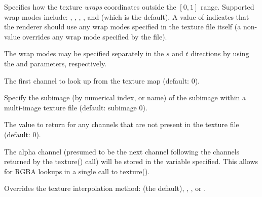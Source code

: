 \documentclass[11pt,letterpaper]{book}
\begin{document}
\vspace{12pt}

Specifies how the texture \emph{wraps} coordinates outside the $[0,1]$
range.  Supported wrap modes include: , ,
, , and  (which is the default).  A
value of  indicates that the renderer should use any wrap
modes specified in the texture file itself (a non- value
overrides any wrap mode specified by the file).

The wrap modes may be specified separately in the $s$ and $t$ directions
by using the  and  parameters, respectively.
\apiend
\vspace{-16pt}

\vspace{12pt}
The first channel to look up from the texture map (default: 0).
\apiend
\vspace{-16pt}

\vspace{12pt}
Specify the subimage (by numerical index, or name) of the subimage
within a multi-image texture file (default: subimage 0).
\apiend
\vspace{-16pt}

\vspace{12pt}
The value to return for any channels that are not present in the texture
file (default: 0).
\apiend
\vspace{-16pt}

\vspace{12pt}
The alpha channel (presumed to be the next channel following the
channels returned by the {\cf texture()} call) will be stored in the
variable specified.  This allows for RGBA lookups in a single call to
{\cf texture()}.
\apiend
\vspace{-16pt}

\vspace{12pt}
Overrides the texture interpolation method:  (the 
default), , , or .
\apiend
\vspace{-16pt}

\apiend

\end{document}
